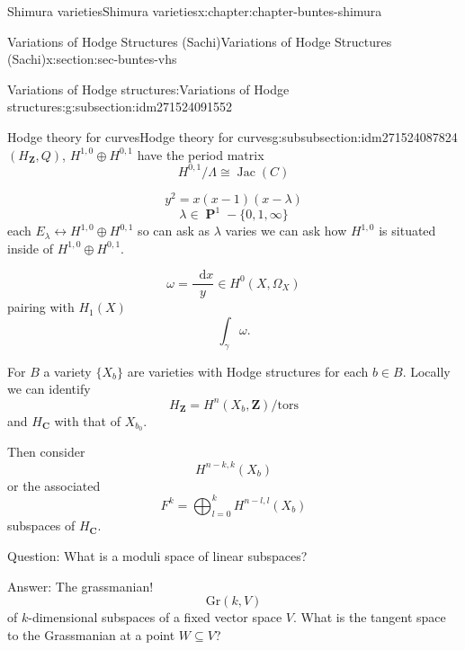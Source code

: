 \documentclass[oneside,10pt,]{book}
\numberwithin{equation}{section}
\newcommand{\diff}{\mathop{}\!\mathrm{d}}
\newcommand{\ZZ}{\mathbf{Z}}
\newcommand{\CC}{\mathbf{C}}
\newcommand{\tors}{\mathrm{tors}}
\DeclareMathOperator{\Jac}{Jac}
\DeclareMathOperator{\PP}{\mathbf{P}}
\begin{document}
\begin{chapterptx}{Shimura varieties}{}{Shimura varieties}{}{}{x:chapter:chapter-buntes-shimura}
\begin{sectionptx}{Variations of Hodge Structures (Sachi)}{}{Variations of Hodge Structures (Sachi)}{}{}{x:section:sec-buntes-vhs}
\begin{subsectionptx}{Variations of Hodge structures:}{}{Variations of Hodge structures:}{}{}{g:subsection:idm271524091552}
%
%
\typeout{************************************************}
\typeout{************************************************}
%
\begin{subsubsectionptx}{Hodge theory for curves}{}{Hodge theory for curves}{}{}{g:subsubsection:idm271524087824}
\((H_\ZZ, Q)\), \(H^{1,0} \oplus H^{0,1}\) have the period matrix%
\begin{equation*}
H^{0,1}/\Lambda \cong \Jac(C)
\end{equation*}
%
\par
%
\begin{equation*}
y^2 = x(x-1)(x-\lambda)
\end{equation*}
%
\begin{equation*}
\lambda \in \PP^1 - \{0,1,\infty\}
\end{equation*}
each \(E_\lambda \leftrightarrow H^{1,0} \oplus H^{0,1}\) so can ask as \(\lambda\) varies we can ask how \(H^{1,0}\) is situated inside of \(H^{1,0} \oplus H^{0,1}\).%
\par
%
\begin{equation*}
\omega = \frac{\diff x}{y} \in H^0(X,\Omega_X)
\end{equation*}
pairing with \(H_1(X)\)%
\begin{equation*}
\int_\gamma \omega\text{.}
\end{equation*}
%
\par
For \(B\) a variety \(\{X_b\}\) are varieties with Hodge structures for each \(b\in B\). Locally we can identify%
\begin{equation*}
H_\ZZ = H^n(X_b , \ZZ)/\tors
\end{equation*}
and \(H_\CC \) with that of \(X_{b_0}\).%
\par
Then consider%
\begin{equation*}
H^{n-k, k}(X_b)
\end{equation*}
or the associated%
\begin{equation*}
F^k = \bigoplus_{l=0}^k H^{n-l,l}(X_b)
\end{equation*}
subspaces of \(H_\CC\).%
\par
Question: What is a moduli space of linear subspaces?%
\par
Answer: The grassmanian!%
\begin{equation*}
{\mathrm{Gr}}(k,V)
\end{equation*}
of \(k\)-dimensional subspaces of a fixed vector space \(V\). What is the tangent space to the Grassmanian at a point \(W\subseteq V\)?%

\end{subsubsectionptx}
\end{subsectionptx}
\end{sectionptx}
\end{chapterptx}
\end{document}
